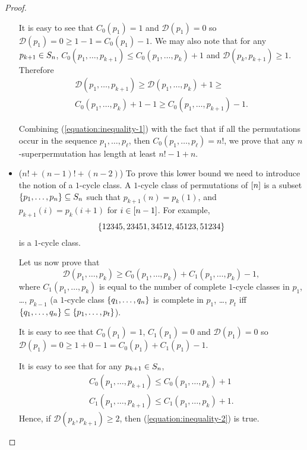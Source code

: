 \begin{proof}
\begin{itemize}
      It is easy to see that $C_0(p_1) = 1$ and $\mathcal{D}(p_1) = 0$ so
      $\mathcal{D}(p_1) = 0 \ge 1 - 1 = C_0(p_1) - 1$. We may also
      note that for any $p_{k + 1} \in S_{n}$,
      $C_0(p_1, \dots, p_{k + 1}) \le C_0(p_1, \dots, p_k) + 1$ and
      $\mathcal{D}(p_k, p_{k + 1}) \ge 1$. Therefore
      \begin{multline*}
        \mathcal{D}(p_1, \dots, p_{k + 1}) \ge
        \mathcal{D}(p_1, \dots, p_k) + 1 \ge \\
        C_0(p_1, \dots, p_k) + 1 - 1 \ge
        C_0(p_1, \dots, p_{k + 1}) - 1.
      \end{multline*}

      Combining (\ref{equation:inequality-1}) with the fact that if all the
      permutations occur in the sequence $p_1, \dots, p_\ell$, then
      $C_0(p_1, \dots, p_\ell) = n!$,
      we prove that any $n$-superpermutation has length at least $n! - 1 + n$.
    \item ($n! + (n - 1)! + (n - 2)$)
      To prove this lower bound we need to introduce the notion of a $1$-cycle
      class. A $1$-cycle class of permutations of ${[{n}]}$ is a
      subset $\set{p_1, \dots, p_n} \subseteq \permutations{n}$ such that $p_{k + 1}(n) =
      p_k(1)$, and $p_{k + 1}(i) = p_k(i + 1)$ for $i \in {[{n - 1}]}$. For
      example,
      \[
        \set{12345, 23451, 34512, 45123, 51234}
      \]
      is a $1$-cycle class.

      Let us now prove that
      \begin{equation}
        \label{equation:inequality-2}
        \mathcal{D}(p_1, \dots, p_k) \ge
        C_0(p_1, \dots, p_k) + C_1(p_1, \dots, p_k) - 1,
      \end{equation}
      where $C_1(p_1, \dots, p_k)$ is equal to the number of complete $1$-cycle
      classes in $p_1$, \dots, $p_{k - 1}$ (a $1$-cycle class
      $\set{q_1, \dots, q_n}$ is complete in $p_1$, \dots, $p_t$ iff
      $\set{q_1, \dots, q_n} \subseteq \set{p_1, \dots, p_t}$).

      It is easy to see that $C_0(p_1) = 1$, $C_1(p_1) = 0$ and
      $\mathcal{D}(p_1) = 0$ so
      $\mathcal{D}(p_1) = 0 \ge 1 + 0 - 1 = C_0(p_1) + C_1(p_1) - 1$.

      It is easy to see that for any $p_{k + 1} \in S_{n}$,
      \begin{gather*}
        C_0(p_1, \dots, p_{k + 1}) \le C_0(p_1, \dots, p_k) + 1  \\
        C_1(p_1, \dots, p_{k + 1}) \le C_1(p_1, \dots, p_k) + 1.
      \end{gather*}
      Hence, if $\mathcal{D}(p_k, p_{k + 1}) \ge 2$, then
      (\ref{equation:inequality-2}) is true.


\end{itemize}
\end{proof}
